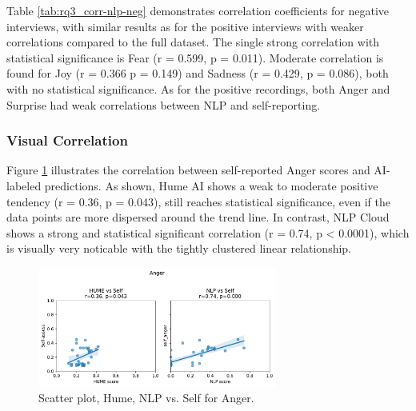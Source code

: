 Table \ref{tab:rq3_corr-nlp-neg} demonstrates correlation coefficients for negative interviews, with similar results as for the positive interviews with weaker correlations compared to the full dataset. The single strong correlation with statistical significance is Fear (r = 0.599, p = 0.011). 
Moderate correlation is found for Joy (r = 0.366 p = 0.149) and Sadness (r = 0.429, p = 0.086), both with no statistical significance. As for the positive recordings, both Anger and Surprise had weak correlations between NLP and self-reporting. 


\subsubsection{Visual Correlation}
Figure \ref{fig:scatter-anger-rq3} illustrates the correlation between self-reported Anger scores and AI-labeled predictions. As shown, Hume AI shows a weak to moderate positive tendency (r = 0.36, p = 0.043), still reaches statistical significance, even if the data points are more dispersed around the trend line. 
In contrast, NLP Cloud shows a strong and statistical significant correlation (r = 0.74, p < 0.0001), which is visually very noticable with the tightly clustered linear relationship. 

\begin{figure}[!h]
    \centering
    \includegraphics[width=0.7\textwidth]{png/results/rq3/scatter_anger_vs_self.pdf}
    \caption{Scatter plot, Hume, NLP vs. Self for Anger.}
    \label{fig:scatter-anger-rq3}
\end{figure}

